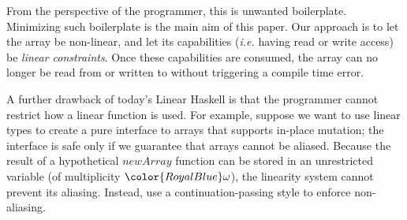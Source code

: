 \documentclass[acmsmall,usenames,dvipsnames,natbib=false,acmthm=false,screen]{acmart}
\newcommand{\Varid}[1]{\mathit{#1}}
\newcommand{\multiplicitycolour}{\color{RoyalBlue}}
\newcommand{\multiplicityfont}[1]{{\multiplicitycolour#1}}
\newcommand{\keyword}[1]{\mathbf{#1}}
\newcommand{\klet}{\keyword{let}}
\newcommand{\kcase}{\keyword{case}}
\theoremstyle{acmplain}
\theoremstyle{acmdefinition}
\begin{document}
From the perspective of the programmer, this is unwanted boilerplate.
Minimizing such boilerplate is the main aim of this paper.  Our
approach is to let the array be non-linear, and let its
capabilities (\emph{i.e.} having read or write access) be \emph{linear
constraints}. Once these capabilities are consumed, the array can no
longer be read from or written to without triggering a compile time
error.

A further drawback of today's Linear Haskell is that
the programmer cannot restrict how a linear function is used.
For example, suppose we want to use linear types to create
a pure interface to arrays that supports in-place mutation;
the interface is safe only if we guarantee that arrays cannot
be aliased. Because the result of a hypothetical \ensuremath{\Varid{newArray}}
function can be stored in an unrestricted variable (of multiplicity
$  \multiplicityfont{ \omega }  $), the linearity system cannot prevent its aliasing.
Instead, \citet[Fig.~2]{LinearHaskell} use a continuation-passing
style to enforce non-aliasing.

\end{document}

